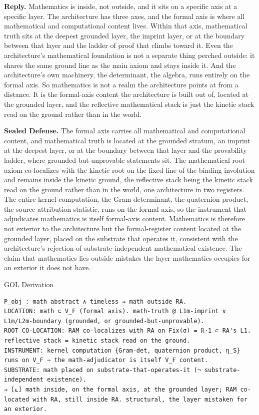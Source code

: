 \documentclass[10pt,twocolumn]{article}
\begin{document}
\textbf{Reply.} Mathematics is inside, not outside, and it sits on a
specific axis at a specific layer. The architecture has three axes, and
the formal axis is where all mathematical and computational content
lives. Within that axis, mathematical truth sits at the deepest grounded
layer, the imprint layer, or at the boundary between that layer and the
ladder of proof that climbs toward it. Even the architecture's
mathematical foundation is not a separate thing perched outside: it
shares the same ground line as the main axiom and stays inside it. And
the architecture's own machinery, the determinant, the algebra, runs
entirely on the formal axis. So mathematics is not a realm the
architecture points at from a distance. It is the formal-axis content
the architecture is built out of, located at the grounded layer, and the
reflective mathematical stack is just the kinetic stack read on the
ground rather than in the world.

\textbf{Sealed Defense.} The formal axis carries all mathematical and
computational content, and mathematical truth is located at the grounded
stratum, an imprint at the deepest layer, or at the boundary between
that layer and the provability ladder, where grounded-but-unprovable
statements sit. The mathematical root axiom co-localizes with the
kinetic root on the fixed line of the binding involution and remains
inside the kinetic ground, the reflective stack being the kinetic stack
read on the ground rather than in the world, one architecture in two
registers. The entire kernel computation, the Gram determinant, the
quaternion product, the source-attribution statistic, runs on the formal
axis, so the instrument that adjudicates mathematics is itself
formal-axis content. Mathematics is therefore not exterior to the
architecture but the formal-register content located at the grounded
layer, placed on the substrate that operates it, consistent with the
architecture's rejection of substrate-independent mathematical
existence. The claim that mathematics lies outside mistakes the layer
mathematics occupies for an exterior it does not have.

\begin{golbox}{GOL Derivation}
\begin{lstlisting}[style=golv]
P_obj : math abstract ∧ timeless ⇒ math outside RA.
LOCATION: math ⊂ V_F (formal axis). math-truth @ L1m-imprint ∨ L1m/L2m-boundary (grounded, or grounded-but-unprovable).
ROOT CO-LOCATION: RAM co-localizes with RA on Fix(σ) = ℝ·1 ⊂ RA's L1. reflective stack = kinetic stack read on the ground.
INSTRUMENT: kernel computation {Gram-det, quaternion product, η_S} runs on V_F ⇒ the math-adjudicator is itself V_F content.
SUBSTRATE: math placed on substrate-that-operates-it (¬ substrate-independent existence).
⇒ [⟀] math inside, on the formal axis, at the grounded layer; RAM co-located with RA, still inside RA. structural, the layer mistaken for an exterior.
\end{lstlisting}
\end{golbox}
\end{document}

